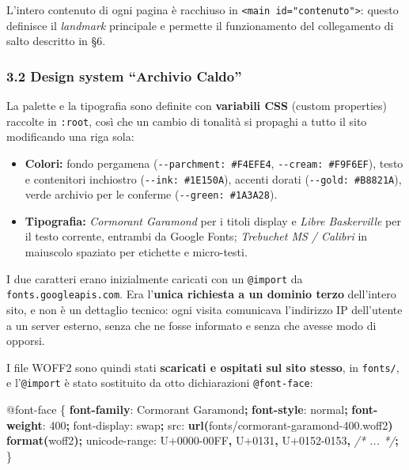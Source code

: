 \documentclass[
  11pt,
]{article}
\newenvironment{Shaded}{\begin{snugshade}}{\end{snugshade}}
\newcommand{\CommentTok}[1]{\textcolor[rgb]{0.56,0.35,0.01}{\textit{#1}}}
\newcommand{\DecValTok}[1]{\textcolor[rgb]{0.00,0.00,0.81}{#1}}
\newcommand{\FunctionTok}[1]{\textcolor[rgb]{0.13,0.29,0.53}{\textbf{#1}}}
\newcommand{\ImportTok}[1]{#1}
\newcommand{\KeywordTok}[1]{\textcolor[rgb]{0.13,0.29,0.53}{\textbf{#1}}}
\newcommand{\NormalTok}[1]{#1}
\newcommand{\OperatorTok}[1]{\textcolor[rgb]{0.81,0.36,0.00}{\textbf{#1}}}
\newcommand{\StringTok}[1]{\textcolor[rgb]{0.31,0.60,0.02}{#1}}
\providecommand{\tightlist}{%
  \setlength{\itemsep}{0pt}\setlength{\parskip}{0pt}}
\begin{document}
L'intero contenuto di ogni pagina è racchiuso in
\texttt{\textless{}main\ id="contenuto"\textgreater{}}: questo definisce
il \emph{landmark} principale e permette il funzionamento del
collegamento di salto descritto in §6.

\hypertarget{design-system-archivio-caldo}{%
\subsubsection{3.2 Design system ``Archivio
Caldo''}\label{design-system-archivio-caldo}}

La palette e la tipografia sono definite con \textbf{variabili CSS}
(custom properties) raccolte in \texttt{:root}, così che un cambio di
tonalità si propaghi a tutto il sito modificando una riga sola:

\begin{itemize}
\tightlist
\item
  \textbf{Colori:} fondo pergamena (\texttt{-\/-parchment:\ \#F4EFE4},
  \texttt{-\/-cream:\ \#F9F6EF}), testo e contenitori inchiostro
  (\texttt{-\/-ink:\ \#1E150A}), accenti dorati
  (\texttt{-\/-gold:\ \#B8821A}), verde archivio per le conferme
  (\texttt{-\/-green:\ \#1A3A28}).
\item
  \textbf{Tipografia:} \emph{Cormorant Garamond} per i titoli display e
  \emph{Libre Baskerville} per il testo corrente, entrambi da Google
  Fonts; \emph{Trebuchet MS / Calibri} in maiuscolo spaziato per
  etichette e micro-testi.
\end{itemize}

I due caratteri erano inizialmente caricati con un \texttt{@import} da
\texttt{fonts.googleapis.com}. Era l'\textbf{unica richiesta a un
dominio terzo} dell'intero sito, e non è un dettaglio tecnico: ogni
visita comunicava l'indirizzo IP dell'utente a un server esterno, senza
che ne fosse informato e senza che avesse modo di opporsi.

I file WOFF2 sono quindi stati \textbf{scaricati e ospitati sul sito
stesso}, in \texttt{fonts/}, e l'\texttt{@import} è stato sostituito da
otto dichiarazioni \texttt{@font-face}:

\begin{Shaded}
\begin{Highlighting}[]
\ImportTok{@font{-}face}\NormalTok{ \{}
  \KeywordTok{font{-}family}\NormalTok{: }\StringTok{\textquotesingle{}Cormorant Garamond\textquotesingle{}}\OperatorTok{;}
  \KeywordTok{font{-}style}\NormalTok{: }\DecValTok{normal}\OperatorTok{;}
  \KeywordTok{font{-}weight}\NormalTok{: }\DecValTok{400}\OperatorTok{;}
\NormalTok{  font{-}display: swap}\OperatorTok{;}
\NormalTok{  src: }\FunctionTok{url(}\StringTok{\textquotesingle{}fonts/cormorant{-}garamond{-}400.woff2\textquotesingle{}}\FunctionTok{)} \FunctionTok{format(}\StringTok{\textquotesingle{}woff2\textquotesingle{}}\FunctionTok{)}\OperatorTok{;}
\NormalTok{  unicode{-}range: U}\DecValTok{+000}\NormalTok{0}\DecValTok{{-}00}\NormalTok{FF}\OperatorTok{,}\NormalTok{ U}\DecValTok{+0131}\OperatorTok{,}\NormalTok{ U}\DecValTok{+015}\NormalTok{2}\DecValTok{{-}0153}\OperatorTok{,} \CommentTok{/* ... */}\OperatorTok{;}
\NormalTok{\}}
\end{Highlighting}
\end{Shaded}
\end{document}
